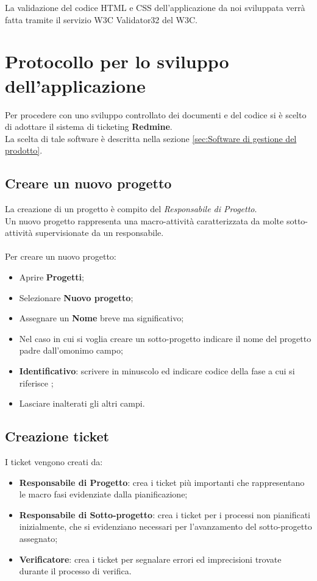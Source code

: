 
La validazione del codice HTML e CSS dell’applicazione da noi sviluppata verrà
fatta tramite il servizio W3C Validator32 del W3C.


\section{Protocollo per lo sviluppo dell'applicazione} 
Per procedere con uno sviluppo controllato dei documenti e del codice si è scelto di adottare il sistema di ticketing \textbf{Redmine}.\\ 
La scelta di tale software è descritta nella sezione \ref{sec:Software di gestione del prodotto}.

\subsection{Creare un nuovo progetto} 

La creazione di un progetto è compito del \emph{Responsabile di Progetto}.\\ 
Un nuovo progetto rappresenta una macro-attività caratterizzata da molte sotto-attività 
supervisionate da un responsabile.\\\\ 
Per creare un nuovo progetto:
\begin{itemize}
\item Aprire \textbf{Progetti}; 
\item Selezionare \textbf{Nuovo progetto}; 
\item Assegnare un \textbf{Nome} breve ma significativo; 
\item Nel caso in cui si voglia creare un sotto-progetto indicare il nome del progetto padre dall’omonimo campo; 
\item \textbf{Identificativo}: scrivere in minuscolo ed indicare codice della fase a cui si riferisce ;
\item Lasciare inalterati gli altri campi. 
\end{itemize}
 
\subsection{Creazione ticket}
 
  I ticket vengono creati da:
 \begin{itemize}
 

    \item \textbf{Responsabile di Progetto}: crea i ticket più importanti che rappresentano le macro fasi evidenziate dalla pianificazione; 
	\item \textbf{Responsabile di Sotto-progetto}: crea i ticket per i processi non pianificati inizialmente, che si evidenziano necessari per l’avanzamento del sotto-progetto assegnato; 
	\item \textbf{Verificatore}: crea i ticket per segnalare errori ed imprecisioni trovate durante il processo di verifica. 
 \end{itemize}


